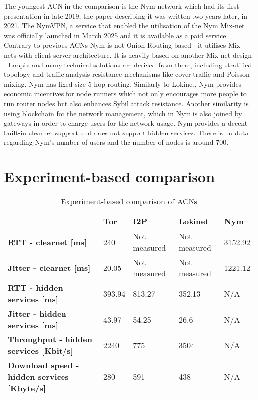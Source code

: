 The youngest ACN in the comparison is the Nym network which had its first presentation in late 2019, the paper describing it was written two years later, in 2021. The NymVPN, a service that enabled the utilisation of the Nym Mix-net was officially launched in March 2025 and it is available as a paid service. Contrary to previous ACNs Nym is not Onion Routing-based - it utilises Mix-nets with client-server architecture. It is heavily based on another Mix-net design - Loopix and many technical solutions are derived from there, including stratified topology and traffic analysis resistance mechanisms like cover traffic and Poisson mixing. Nym has fixed-size 5-hop routing. Similarly to Lokinet, Nym provides economic incentives for node runners which not only encourages more people to run router nodes but also enhances Sybil attack resistance. Another similarity is using blockchain for the network management, which in Nym is also joined by gateways in order to charge users for the network usage. Nym provides a decent built-in clearnet support and does not support hidden services. There is no data regarding Nym’s number of users and the number of nodes is around 700.

\section{Experiment-based comparison}

\begin{table}[!ht]
\caption{Experiment-based comparison of ACNs}
\label{tab:experiment_comparison}
\small
\begin{tabular}{|p{}|p{}|p{}|p{}|p{}|}
\hline
\textbf{} & \textbf{Tor} & \textbf{I2P} & \textbf{Lokinet} & \textbf{Nym} \\
\hline
\textbf{RTT - clearnet [ms]} & 240 & Not measured & Not measured & 3152.92 \\
\hline
\textbf{Jitter - clearnet [ms]} & 20.05 & Not measured & Not measured & 1221.12 \\
\hline
\textbf{RTT - hidden services [ms]} & 393.94 & 813.27 & 352.13 & N/A \\
\hline
\textbf{Jitter - hidden services [ms]} & 43.97 & 54.25 & 26.6 & N/A \\
\hline
\textbf{Throughput - hidden services [Kbit/s]} & 2240 & 775 & 3504 & N/A \\
\hline
\textbf{Download speed - hidden services [Kbyte/s]} & 280 & 591 & 438 & N/A \\
\hline
\end{tabular}
\end{table}

